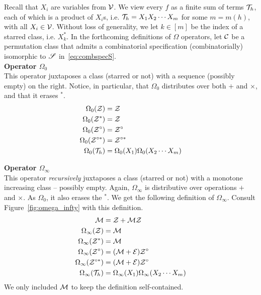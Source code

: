 \documentclass[12pt, a4paper, twoside]{report}
\begin{document}
Recall that $X_i$ are variables from $\mathcal{V}$. We view every $f$ as a finite sum of terms $\mathcal{T}_h$, each of which is a product of $X_i$s, i.e. $\mathcal{T}_h = X_1X_2\cdots X_m$ for some $m = m(h)$, with all $X_i \in \mathcal{V}$. Without loss of generality, we let $k \in [m]$ be the index of a starred class, i.e. $X_k^*$. In the forthcoming definitions of $\Omega$ operators, let $\mathcal{C}$ be a permutation class that admits a combinatorial specification (combinatorially) isomorphic to $\mathscr{S}$ in~\eqref{eq:combspecS}.\\


\noindent\textbf{Operator $\Omega_0$}\\
This operator juxtaposes a class (starred or not) with a sequence (possibly empty) on the right. Notice, in particular, that $\Omega_0$ distributes over both $+$ and $\times$, and that it erases ${}^*$. 
\begin{align*}
  \Omega_0(\mathcal{Z}) &= \mathcal{Z}\\
  \Omega_0(\mathcal{Z}^*) &= \mathcal{Z}\\
  \Omega_0(\mathcal{Z}^\circ) &= \mathcal{Z}^\circ\\
  \Omega_0(\mathcal{Z}^{\circ*}) &= \mathcal{Z}^{\circ*}\\
  \Omega_0(\mathcal{T}_h) &= \Omega_0(X_1)\Omega_0(X_2\cdots X_m)
\end{align*}

\noindent\textbf{Operator $\Omega_\infty$}\\
This operator \emph{recursively} juxtaposes a class (starred or not) with a monotone increasing class -- possibly empty. Again, $\Omega_\infty$ is distributive over operations $+$ and $\times$. As $\Omega_0$, it also erases the ${}^*$. We get the following definition of $\Omega_\infty$. Consult Figure~\ref{fig:omega_infty} with this definition.
\begin{align*}
  \mathcal{M} &= \mathcal{Z} + \mathcal{M}\mathcal{Z}\\
  \Omega_\infty(\mathcal{Z}) &= \mathcal{M}\\
  \Omega_\infty(\mathcal{Z}^*) &= \mathcal{M}\\
  \Omega_\infty(\mathcal{Z}^\circ) &= (\mathcal{M}+\mathcal{E})\mathcal{Z}^\circ\\
  \Omega_\infty(\mathcal{Z}^{\circ*}) &= (\mathcal{M}+\mathcal{E})\mathcal{Z}^\circ\\
  \Omega_\infty(\mathcal{T}_h) &= \Omega_\infty(X_1)\Omega_\infty(X_2\cdots X_m)
\end{align*}
We only included $\mathcal{M}$ to keep the definition self-contained.
\end{document}
